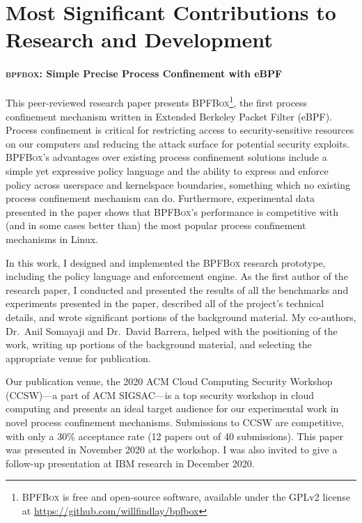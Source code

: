 \section{Most Significant Contributions to Research and Development}

\paragraph*{\textsc{bpfbox}: Simple Precise Process Confinement with eBPF}
This peer-reviewed research paper presents \textsc{BPFBox}\footnote{\textsc{BPFBox}
is free and open-source software, available under the GPLv2 license at
\url{https://github.com/willfindlay/bpfbox}}, the first process confinement
mechanism written in Extended Berkeley Packet Filter (eBPF).
Process confinement is critical for restricting access to security-sensitive resources on
our computers and reducing the attack surface for potential security exploits.
\textsc{BPFBox}'s advantages over existing process confinement solutions include a simple
yet expressive policy language and the ability to express and enforce policy across
userspace and kernelspace boundaries, something which no existing process confinement
mechanism can do. Furthermore, experimental data presented in the paper shows that
\textsc{BPFBox}'s performance is competitive with (and in some cases better than) the most
popular process confinement mechanisms in Linux.

In this work, I designed and implemented the \textsc{BPFBox} research prototype, including
the policy language and enforcement engine. As the first author of the research paper,
I conducted and presented the results of all the benchmarks and experiments presented in
the paper, described all of the project's technical details, and wrote significant
portions of the background material.  My co-authors, Dr.\ Anil Somayaji and Dr.\ David
Barrera, helped with the positioning of the work, writing up portions of the background
material, and selecting the appropriate venue for publication.

Our publication venue, the 2020 ACM Cloud Computing Security Workshop (CCSW)---a part of
ACM SIGSAC---is a top security workshop in cloud computing and presents an ideal
target audience for our experimental work in novel process confinement mechanisms.
Submissions to CCSW are competitive, with only a 30\% acceptance rate (12 papers out
of 40 submissions). This paper was presented in November 2020 at the workshop. I was also
invited to give a follow-up presentation at IBM research in December 2020.


